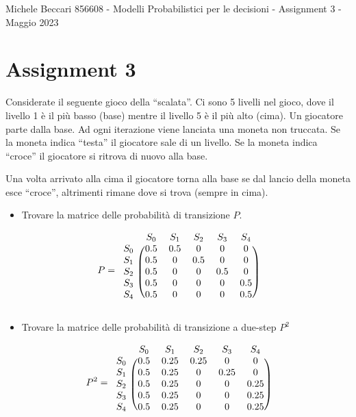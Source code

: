 \documentclass{article}
\begin{document}
	{Michele Beccari 856608 - Modelli Probabilistici per le decisioni -  Assignment 3 - Maggio 2023} 
	\section{Assignment 3}
Considerate il seguente gioco della “scalata”. Ci sono 5 livelli nel gioco, dove il livello 1 è il più basso (base) mentre il livello 5 è il più alto (cima). Un giocatore parte dalla base. Ad ogni iterazione viene lanciata una moneta non truccata. Se la moneta indica “testa” il giocatore sale di un livello. Se la moneta indica “croce” il giocatore si ritrova di nuovo alla base. 

Una volta arrivato alla cima il giocatore torna alla base se dal lancio della moneta esce “croce”, altrimenti rimane dove si trova (sempre in cima).

\begin{itemize}
	\item Trovare la matrice delle probabilità di transizione $P$.
\end{itemize}

\[
P = 
\begin{blockarray}{cccccc}
	& S_0 & S_1 & S_2 & S_3 & S_4 \\
	\begin{block}{c(ccccc)}
		S_0 &	0.5 &  0.5   & 0   & 0   & 0   \\
		S_1 &	0.5 &  0     & 0.5 & 0   & 0   \\
		S_2 &	0.5 &  0     & 0   & 0.5 & 0   \\
		S_3 &	0.5 &  0     & 0   & 0   & 0.5 \\
		S_4 &	0.5 &  0     & 0   & 0   & 0.5   \\
	\end{block}
\end{blockarray}
\]	

\begin{itemize}
	\item Trovare la matrice delle probabilità di transizione a due-step $P^2$	
\end{itemize}



\[
P^2 = 
\begin{blockarray}{cccccc}
	& S_0 & S_1 & S_2 & S_3 & S_4 \\
	\begin{block}{c(ccccc)}
		S_0 &	0.5 &  0.25   & 0.25 & 0     & 0      \\
		S_1 &	0.5 &  0.25   & 0    & 0.25  & 0      \\
		S_2 &	0.5 &  0.25   & 0    & 0     & 0.25   \\
		S_3 &	0.5 &  0.25   & 0    & 0     & 0.25    \\
		S_4 &	0.5 &  0.25   & 0    & 0     & 0.25   \\
	\end{block}
\end{blockarray}
\]	
\end{document}
